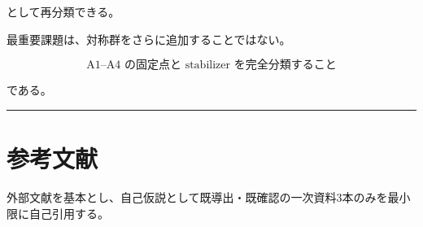 \documentclass[
  a4paper,
]{ltjsarticle}
\begin{document}
として再分類できる。

最重要課題は、対称群をさらに追加することではない。

\[
\boxed{
\text{A1--A4 の固定点と stabilizer を完全分類すること}
}
\]

である。

\begin{center}\rule{0.5\linewidth}{0.5pt}\end{center}

\section{参考文献}\label{ux53c2ux8003ux6587ux732e}

外部文献を基本とし、自己仮説として既導出・既確認の一次資料3本のみを最小限に自己引用する。
\end{document}
